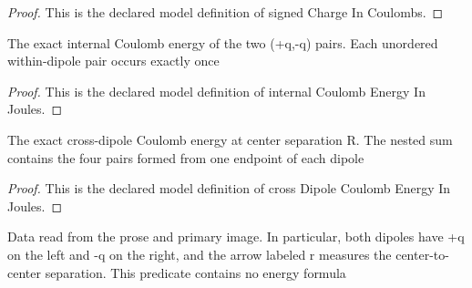\begin{proof}
  This is the declared model definition of signed Charge In Coulombs.
\end{proof}
\begin{definition}
  \label{def:physics:phyx-mini-0522:phyxminiproblems-problemphyxmini0522-internalcoulombenergyinjoules}
  The exact internal Coulomb energy of the two (+q,-q) pairs. Each unordered within-dipole pair occurs exactly once
\end{definition}
\begin{proof}
  This is the declared model definition of internal Coulomb Energy In Joules.
\end{proof}
\begin{definition}
  \label{def:physics:phyx-mini-0522:phyxminiproblems-problemphyxmini0522-crossdipolecoulombenergyinjoules}
  The exact cross-dipole Coulomb energy at center separation R. The nested sum contains the four pairs formed from one endpoint of each dipole
\end{definition}
\begin{proof}
  This is the declared model definition of cross Dipole Coulomb Energy In Joules.
\end{proof}
\begin{definition}
  \label{def:physics:phyx-mini-0522:phyxminiproblems-problemphyxmini0522-matchesproblemandprimaryfigure}
  Data read from the prose and primary image. In particular, both dipoles have +q on the left and -q on the right, and the arrow labeled r measures the center-to-center separation. This predicate contains no energy formula
\end{definition}
